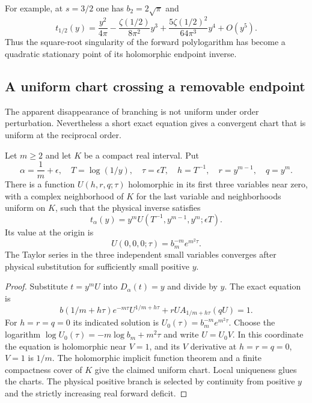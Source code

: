 For example, at $s=3/2$ one has $b_2=2\sqrt\pi$ and
\[
 t_{1/2}(y)=\frac{y^2}{4\pi}
 -\frac{\zeta(1/2)}{8\pi^2}y^3
 +\frac{5\zeta(1/2)^2}{64\pi^3}y^4+O(y^5).
\]
Thus the square-root singularity of the forward polylogarithm has
become a quadratic stationary point of its holomorphic endpoint inverse.

\subsection{A uniform chart crossing a removable endpoint}

The apparent disappearance of branching is not uniform under order
perturbation.  Nevertheless a short exact equation gives a convergent
chart that is uniform at the reciprocal order.

\begin{samepage}
\begin{theorem}\label{jct:thm:reciprocal-chart}
Let $m\ge2$ and let $K$ be a compact real interval.  Put
\[
 \alpha=\frac1m+\epsilon,\quad T=\log(1/y),\quad
 \tau=\epsilon T,\quad h=T^{-1},\quad r=y^{m-1},\quad q=y^m.
\]
There is a function $U(h,r,q;\tau)$ holomorphic in its first three
variables near zero, with a complex neighborhood of $K$ for the last
variable and neighborhoods uniform on $K$, such that the physical
inverse satisfies
\[
 t_\alpha(y)=y^m U(T^{-1},y^{m-1},y^m;\epsilon T).
\]
Its value at the origin is
\[
 U(0,0,0;\tau)=b_m^{-m}e^{m^2\tau}.
\]
The Taylor series in the three independent small variables converges
after physical substitution for sufficiently small positive $y$.
\end{theorem}
\end{samepage}

\begin{proof}
Substitute $t=y^m U$ into $D_\alpha(t)=y$ and divide by $y$.
The exact equation is
\[
 b(1/m+h\tau)e^{-m\tau}U^{1/m+h\tau}
 +rU A_{1/m+h\tau}(qU)=1.
\]
For $h=r=q=0$ its indicated solution is
$U_0(\tau)=b_m^{-m}e^{m^2\tau}$.
Choose the logarithm
$\log U_0(\tau)=-m\log b_m+m^2\tau$ and write $U=U_0V$.
In this coordinate the equation is holomorphic near $V=1$, and its
$V$ derivative at $h=r=q=0$, $V=1$ is $1/m$.
The holomorphic implicit function theorem and a finite compactness
cover of $K$ give the claimed uniform chart.  Local uniqueness glues
the charts.  The physical positive branch is selected by continuity
from positive $y$ and the strictly increasing real forward deficit.
\end{proof}

